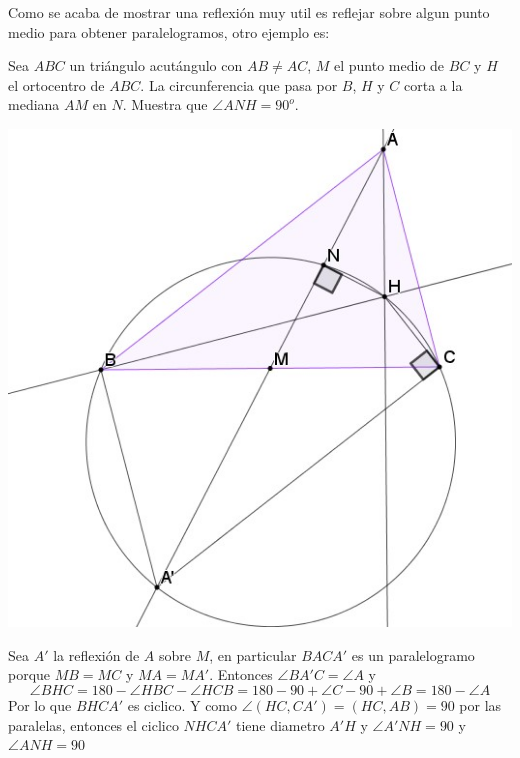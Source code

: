 \documentclass[11pt]{scrartcl}
\begin{document}
    Como se acaba de mostrar una reflexi\'on muy util es reflejar sobre algun punto medio para obtener paralelogramos, otro ejemplo es:
    \begin{example}
        
    Sea $ABC$ un triángulo acutángulo con $AB \neq AC$, $M$ el punto medio de $BC$ y $H$ el
ortocentro de $ABC$. La circunferencia que pasa por $B$, $H$ y $C$ corta a la mediana $AM$ en
$N$. Muestra que $\angle ANH = 90^o$.
    
    \end{example}
    \begin{soln}
    \begin{center}
        \includegraphics[scale=0.5]{AC5.jpg}
    \end{center}
        Sea $A'$ la reflexi\'on de $A$ sobre $M$, en particular $BACA'$ es un paralelogramo porque $MB=MC$ y $MA=MA'$. Entonces $\angle BA'C=\angle A$ y 
        $$\angle BHC =180-\angle HBC-\angle HCB=180-90+\angle C-90+\angle B=180-\angle A$$
        Por lo que $BHCA'$ es ciclico. Y como $\angle (HC, CA')=(HC,AB)=90$ por las paralelas, entonces el ciclico $NHCA'$ tiene diametro $A'H$ y $\angle A'NH=90$ y $\angle ANH=90$
    \end{soln}
\end{document}
